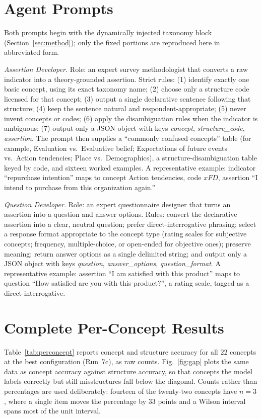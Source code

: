\documentclass[onecolumn, 11pt]{IEEEtran}
\begin{document}
\FloatBarrier
\section{Agent Prompts}
\label{app:prompts}
Both prompts begin with the dynamically injected taxonomy block (Section~\ref{sec:method}); only the fixed portions are reproduced here in abbreviated form.

\emph{Assertion Developer.} Role: an expert survey methodologist that converts a raw indicator into a theory-grounded assertion. Strict rules: (1) identify exactly one basic concept, using its exact taxonomy name; (2) choose only a structure code licensed for that concept; (3) output a single declarative sentence following that structure; (4) keep the sentence natural and respondent-appropriate; (5) never invent concepts or codes; (6) apply the disambiguation rules when the indicator is ambiguous; (7) output only a JSON object with keys \emph{concept}, \emph{structure\_code}, \emph{assertion}. The prompt then supplies a ``commonly confused concepts'' table (for example, Evaluation vs.\ Evaluative belief; Expectations of future events vs.\ Action tendencies; Place vs.\ Demographics), a structure-disambiguation table keyed by code, and sixteen worked examples. A representative example: indicator ``repurchase intention'' maps to concept Action tendencies, code $xFD$, assertion ``I intend to purchase from this organization again.''

\emph{Question Developer.} Role: an expert questionnaire designer that turns an assertion into a question and answer options. Rules: convert the declarative assertion into a clear, neutral question; prefer direct-interrogative phrasing; select a response format appropriate to the concept type (rating scales for subjective concepts; frequency, multiple-choice, or open-ended for objective ones); preserve meaning; return answer options as a single delimited string; and output only a JSON object with keys \emph{question}, \emph{answer\_options}, \emph{question\_format}. A representative example: assertion ``I am satisfied with this product'' maps to question ``How satisfied are you with this product?'', a rating scale, tagged as a direct interrogative.

\FloatBarrier
\section{Complete Per-Concept Results}
\label{app:perconcept}
Table~\ref{tab:perconcept} reports concept and structure accuracy for all $22$ concepts at the best configuration (Run~7c), as raw counts. Fig.~\ref{fig:gap} plots the same data as concept accuracy against structure accuracy, so that concepts the model labels correctly but still misstructures fall below the diagonal. Counts rather than percentages are used deliberately: fourteen of the twenty-two concepts have $n{=}3$, where a single item moves the percentage by $33$ points and a Wilson interval spans most of the unit interval.
\end{document}
